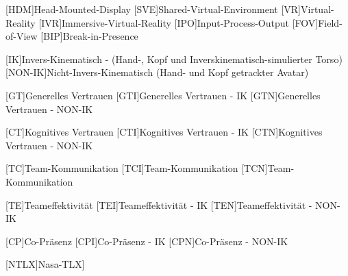 \begin{acronym}
	[HDM]{Head-Mounted-Display}
	[SVE]{Shared-Virtual-Environment}
	[VR]{Virtual-Reality}
	[IVR]{Immersive-Virtual-Reality}
	[IPO]{Input-Process-Output}
	[FOV]{Field-of-View}
	[BIP]{Break-in-Presence}
	
	[IK]{Invers-Kinematisch - (Hand-, Kopf und Inverskinematisch-simulierter Torso)}
	[NON-IK]{Nicht-Invers-Kinematisch (Hand- und Kopf getrackter Avatar)}
	
	[GT]{Generelles Vertrauen}
	[GTI]{Generelles Vertrauen - IK}
	[GTN]{Generelles Vertrauen - NON-IK}
	
	[CT]{Kognitives Vertrauen}
	[CTI]{Kognitives Vertrauen - IK}
	[CTN]{Kognitives Vertrauen - NON-IK}
	
	[TC]{Team-Kommunikation}
	[TCI]{Team-Kommunikation}
	[TCN]{Team-Kommunikation}
	
	[TE]{Teameffektivität}
	[TEI]{Teameffektivität - IK}
	[TEN]{Teameffektivität - NON-IK}
	
	[CP]{Co-Präsenz}
	[CPI]{Co-Präsenz - IK}
	[CPN]{Co-Präsenz - NON-IK}
	
	[NTLX]{Nasa-TLX]}
\end{acronym}
